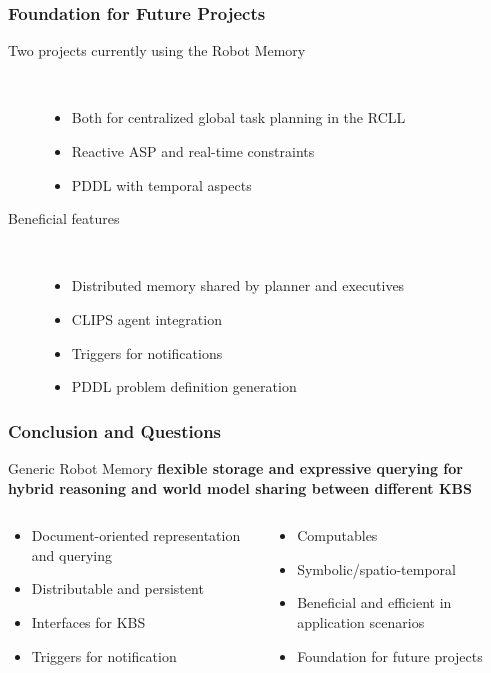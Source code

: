 \begin{frame}
  \frametitle{Foundation for Future Projects}
  \begin{description}
  \item[Two projects currently using the Robot Memory]\hfill\\
    \begin{itemize}
    \item Both for centralized global task planning in the RCLL
    \item Reactive ASP and real-time constraints
    \item PDDL with temporal aspects
    \end{itemize}
  \item[Beneficial features] \hfill \\
    \begin{itemize}
    \item Distributed memory shared by planner and executives
    \item CLIPS agent integration
    \item Triggers for notifications
    \item PDDL problem definition generation
    \end{itemize}
  \end{description}
\end{frame}

\begin{frame}
  \frametitle{Conclusion and Questions}
  \begin{block}{Generic Robot Memory } \centering\bfseries
    flexible storage and expressive querying for hybrid reasoning and world model sharing between different KBS
  \end{block}
  \bigskip
  \begin{columns}
    \begin{column}{0.5\textwidth}
      \begin{itemize}
      \item Document-oriented representation and querying
      \item Distributable and persistent
      \item Interfaces for KBS
      \item Triggers for notification
      \end{itemize}
    \end{column}
    \begin{column}{0.5\textwidth}
      \begin{itemize}
      \item Computables
      \item Symbolic/spatio-temporal
      \item Beneficial and efficient in application scenarios
      \item Foundation for future projects
      \end{itemize}
    \end{column}
  \end{columns}
\end{frame}



